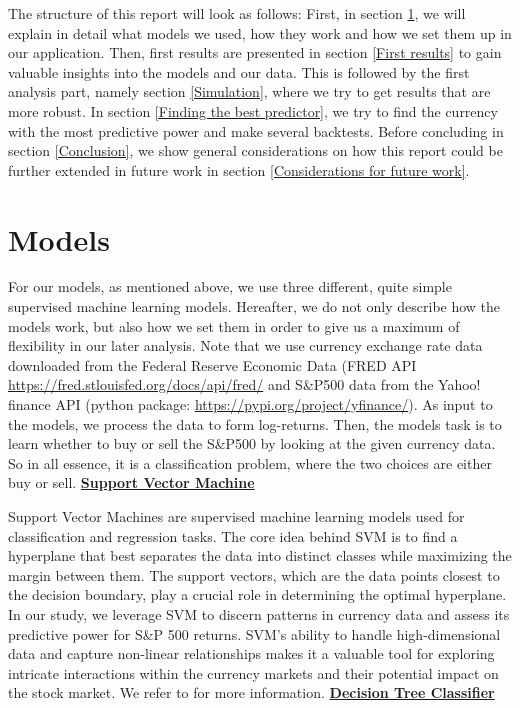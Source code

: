 The structure of this report will look as follows: First, in section \ref{models}, we will explain in detail what models we used, how they work and how we set them up in our application. Then, first results are presented in section \ref{First results} to gain valuable insights into the models and our data. This is followed by the first analysis part, namely section \ref{Simulation}, where we try to get results that are more robust. In section \ref{Finding the best predictor}, we try to find the currency with the most predictive power and make several backtests. Before concluding in section \ref{Conclusion}, we show general considerations on how this report could be further extended in future work in section \ref{Considerations for future work}.

\section{Models}
\label{models}
For our models, as mentioned above, we use three different, quite simple supervised machine learning models. Hereafter, we do not only describe how the models work, but also how we set them in order to give us a maximum of flexibility in our later analysis. Note that we use currency exchange rate data downloaded from the Federal Reserve Economic Data (FRED API \url{https://fred.stlouisfed.org/docs/api/fred/} and S\&P500 data from the Yahoo! finance API (python package: \url{https://pypi.org/project/yfinance/}). As input to the models, we process the data to form log-returns. Then, the models task is to learn whether to buy or sell the S\&P500 by looking at the given currency data. So in all essence, it is a classification problem, where the two choices are either buy or sell.
\newline
\newline
\underline{\textbf{Support Vector Machine}}

\noindent Support Vector Machines are supervised machine learning models used for classification and regression tasks. The core idea behind SVM is to find a hyperplane that best separates the data into distinct classes while maximizing the margin between them. The support vectors, which are the data points closest to the decision boundary, play a crucial role in determining the optimal hyperplane. In our study, we leverage SVM to discern patterns in currency data and assess its predictive power for S\&P 500 returns. SVM's ability to handle high-dimensional data and capture non-linear relationships makes it a valuable tool for exploring intricate interactions within the currency markets and their potential impact on the stock market. We refer to \cite{boseretal} for more information.
\newline
\newline
\underline{\textbf{Decision Tree Classifier}}

